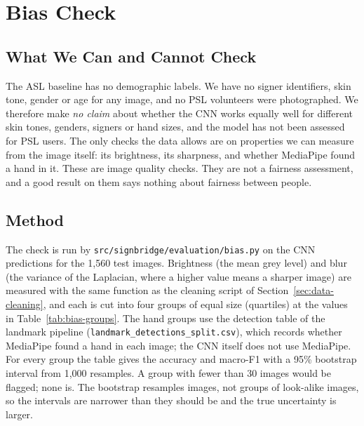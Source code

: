 \section{Bias Check}
\label{sec:bias-check}

\subsection{What We Can and Cannot Check}

The ASL baseline has no demographic labels. We have no signer identifiers, skin tone, gender or age for any image, and no PSL volunteers were photographed. We therefore make \emph{no claim} about whether the CNN works equally well for different skin tones, genders, signers or hand sizes, and the model has not been assessed for PSL users. The only checks the data allows are on properties we can measure from the image itself: its brightness, its sharpness, and whether MediaPipe found a hand in it. These are image quality checks. They are not a fairness assessment, and a good result on them says nothing about fairness between people.

\subsection{Method}

The check is run by \texttt{src/signbridge/evaluation/bias.py} on the CNN predictions for the 1{,}560 test images. Brightness (the mean grey level) and blur (the variance of the Laplacian, where a higher value means a sharper image) are measured with the same function as the cleaning script of Section~\ref{sec:data-cleaning}, and each is cut into four groups of equal size (quartiles) at the values in Table~\ref{tab:bias-groups}. The hand groups use the detection table of the landmark pipeline (\texttt{landmark\_detections\_split.csv}), which records whether MediaPipe found a hand in each image; the CNN itself does not use MediaPipe. For every group the table gives the accuracy and macro-F1 with a 95\% bootstrap interval from 1{,}000 resamples. A group with fewer than 30 images would be flagged; none is. The bootstrap resamples images, not groups of look-alike images, so the intervals are narrower than they should be and the true uncertainty is larger.

